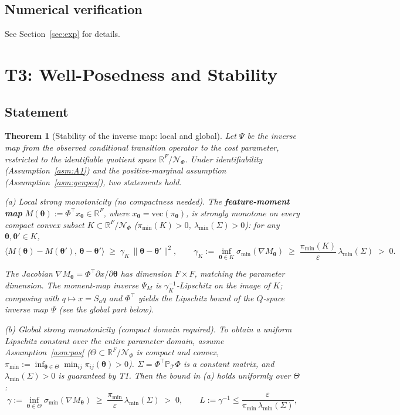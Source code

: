 \documentclass[11pt,a4paper]{article}
\newtheorem{theorem}{Theorem}[section]
\theoremstyle{remark}
\begin{document}
\subsection{Numerical verification}

See Section~\ref{sec:exp} for details.

\section{T3: Well-Posedness and Stability}\label{sec:t3}

\subsection{Statement}

\begin{theorem}[Stability of the inverse map: local and global]\label{thm:T3}
Let $\Psi$ be the inverse map from the observed conditional transition operator to the cost
parameter, restricted to the identifiable quotient space $\mathbb{R}^F/\mathcal{N}_\Phi$.
Under identifiability (Assumption~\ref{asm:A1}) and the positive-marginal assumption
(Assumption~\ref{asm:genpos}), two statements hold.

(a) Local strong monotonicity (no compactness needed). The \textbf{feature-moment map}
$M(\bm{\theta}):=\Phi^{\top}x_{\bm{\theta}}\in\mathbb{R}^F$, where
$x_{\bm{\theta}}=\mathrm{vec}(\pi_{\bm{\theta}})$, is strongly monotone on every compact
convex subset $K\subset\mathbb{R}^F/\mathcal{N}_\Phi$ ($\pi_{\min}(K)>0$,
$\lambda_{\min}(\Sigma)>0$): for any $\bm{\theta},\bm{\theta}'\in K$,
\[
\langle M(\bm{\theta})-M(\bm{\theta}'),\,\bm{\theta}-\bm{\theta}'\rangle
\;\ge\; \gamma_K\,\|\bm{\theta}-\bm{\theta}'\|^{2},
\qquad \gamma_K:=\inf_{\bm{\theta}\in K}\sigma_{\min}(\nabla M_{\bm{\theta}})
\;\ge\; \frac{\pi_{\min}(K)}{\varepsilon}\,\lambda_{\min}(\Sigma)
\;>\;0.
\]

The Jacobian $\nabla M_{\bm{\theta}}=\Phi^{\top}\partial x/\partial\bm{\theta}$ has
dimension $F\times F$, matching the parameter dimension. The moment-map inverse $\Psi_M$ is
$\gamma_K^{-1}$-Lipschitz on the image of $K$; composing with $q\mapsto x=S_a q$ and
$\Phi^{\top}$ yields the Lipschitz bound of the $Q$-space inverse map $\Psi$ (see the
global part below).

(b) Global strong monotonicity (compact domain required). To obtain a uniform Lipschitz
constant over the entire parameter domain, assume Assumption~\ref{asm:pos}
($\Theta\subset\mathbb{R}^F/\mathcal{N}_\Phi$ is compact and convex,
$\pi_{\min}:=\inf_{\bm{\theta}\in\Theta}\min_{ij}\pi_{ij}(\bm{\theta})>0$).
$\Sigma=\Phi^{\top}\mathbb{P}_{\mathcal{T}}\Phi$ is a constant matrix, and
$\lambda_{\min}(\Sigma)>0$ is guaranteed by T1. Then the bound in (a) holds uniformly over
$\Theta$:
\[
\gamma:=\inf_{\bm{\theta}\in\Theta}\sigma_{\min}(\nabla M_{\bm{\theta}})
\;\ge\; \frac{\pi_{\min}}{\varepsilon}\,\lambda_{\min}(\Sigma)
\;>\;0,
\qquad
L:=\gamma^{-1}\le\frac{\varepsilon}{\pi_{\min}\,\lambda_{\min}(\Sigma)},
\]


\end{theorem}
\end{document}
